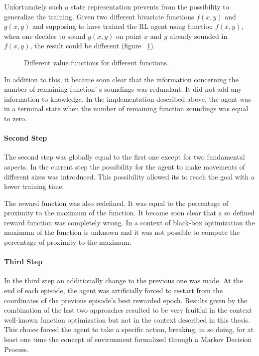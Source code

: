 Unfortunately such a state representation prevents from the possibility to generalize the training. Given two different bivariate functions $f(x, y)$ and $g(x, y)$ and supposing to have trained the RL agent using function $f(x, y)$, when one decides to sound $g(x, y)$ on point $x$ and $y$ already sounded in $f(x, y)$, the result could be different (figure ~\ref{fig:ComparisonBetweenTwoFunctions}).

\begin{figure}[h!]
	\begin{center}
		\subfigure[$f(x, y) = 2xy$, \quad $f(1, 1) = 2$]{%
			\label{fig:2xy}
			\texttt{[image: 2xy]}
		}
	\end{center}
	\caption{
		Different value functions for different functions.
	}
	\label{fig:ComparisonBetweenTwoFunctions}
\end{figure}

In addition to this, it became soon clear that the information concerning the number of remaining function' s soundings was redundant. It did not add any information to knowledge. In the implementation described above, the agent was in a terminal state when the number of remaining function soundings was equal to zero.

\paragraph{Second Step} The second step was globally equal to the first one except for two fundamental aspects. In the current step the possibility for the agent to make movements of different sizes was introduced. This possibility allowed its to reach the goal with a lower training time. 

The reward function was also redefined. It was equal to the percentage of proximity to the maximum of the function. It became soon clear that a so defined reward function was completely wrong. In a context of black-box optimization the maximum of the function is unknown and it was not possible to compute the percentage of proximity to the maximum.

\paragraph{Third Step} In the third step an additionally change to the previous one was made. At the end of each episode, the agent was artificially forced to restart from the coordinates of the previous episode's best rewarded epoch. Results given by the combination of the last two approaches resulted to be very fruitful in the context well-known function optimization but not in the context described in this thesis. This choice forced the agent to take a specific action, breaking, in so doing, for at least one time the concept of environment formalized through a Markov Decision Process.

